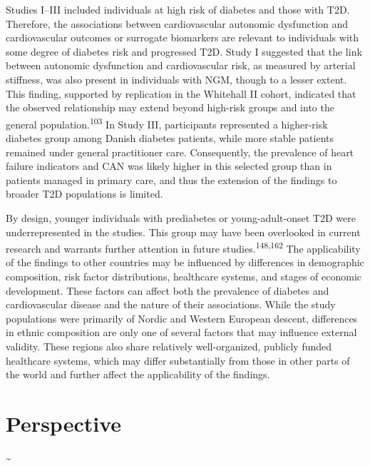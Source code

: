 \documentclass[
  a4paper,
  headsepline=true,
  open=any]{scrbook}
\begin{document}
Studies I--III included individuals at high risk of diabetes and those
with T2D. Therefore, the associations between cardiovascular autonomic
dysfunction and cardiovascular outcomes or surrogate biomarkers are
relevant to individuals with some degree of diabetes risk and progressed
T2D. Study I suggested that the link between autonomic dysfunction and
cardiovascular risk, as measured by arterial stiffness, was also present
in individuals with NGM, though to a lesser extent. This finding,
supported by replication in the Whitehall II cohort, indicated that the
observed relationship may extend beyond high-risk groups and into the
general population.\textsuperscript{103} In Study III, participants
represented a higher-risk diabetes group among Danish diabetes patients,
while more stable patients remained under general practitioner care.
Consequently, the prevalence of heart failure indicators and CAN was
likely higher in this selected group than in patients managed in primary
care, and thus the extension of the findings to broader T2D populations
is limited.

By design, younger individuals with prediabetes or young-adult-onset T2D
were underrepresented in the studies. This group may have been
overlooked in current research and warrants further attention in future
studies.\textsuperscript{148,162} The applicability of the findings to
other countries may be influenced by differences in demographic
composition, risk factor distributions, healthcare systems, and stages
of economic development. These factors can affect both the prevalence of
diabetes and cardiovascular disease and the nature of their
associations. While the study populations were primarily of Nordic and
Western European descent, differences in ethnic composition are only one
of several factors that may influence external validity. These regions
also share relatively well-organized, publicly funded healthcare
systems, which may differ substantially from those in other parts of the
world and further affect the applicability of the findings.


\hypertarget{perspective}{%
\chapter{Perspective}\label{perspective}}

\newpage

\thispagestyle{empty}

\textasciitilde{} \newpage
\end{document}

